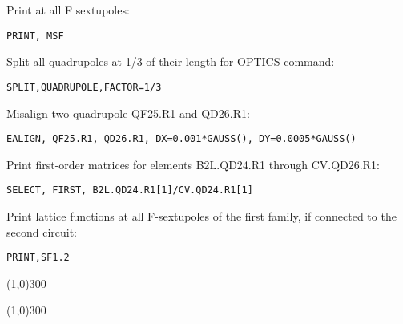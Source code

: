 Print at all F sextupoles: 
\begin{verbatim}
PRINT, MSF
\end{verbatim}

Split all quadrupoles at 1/3 of their length for OPTICS command: 
\begin{verbatim}
SPLIT,QUADRUPOLE,FACTOR=1/3
\end{verbatim}

Misalign two quadrupole QF25.R1 and QD26.R1: 
\begin{verbatim}
EALIGN, QF25.R1, QD26.R1, DX=0.001*GAUSS(), DY=0.0005*GAUSS()
\end{verbatim}

Print first-order matrices for elements B2L.QD24.R1 through CV.QD26.R1:  
\begin{verbatim}
SELECT, FIRST, B2L.QD24.R1[1]/CV.QD24.R1[1]
\end{verbatim}

Print lattice functions at all F-sextupoles of the first family, if connected to the second circuit: 
\begin{verbatim}
PRINT,SF1.2
\end{verbatim}

\line(1,0){300}

\line(1,0){300}

